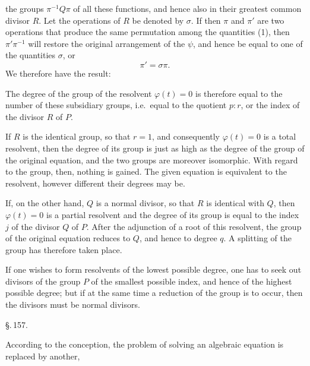 the groups $\pi^{-1}Q\pi$ of all these functions, and hence also in their
greatest common divisor $R$. Let the operations
of $R$ be denoted by $\sigma$. If then $\pi$ and $\pi'$ are two
operations that produce the same permutation among the quantities (1),
then $\pi'\pi^{-1}$ will restore the original arrangement of the $\psi$,
and hence be equal to one of the quantities $\sigma$, or
\[ \pi' = \sigma\pi. \]
We therefore have the result:

\begin{quote}
\end{quote}

The degree of the  group of the resolvent $\varphi(t) = 0$
is therefore equal to the number of these subsidiary groups, i.e.\ equal to the
quotient $p : r$, or the index of the divisor $R$ of $P$.

If $R$ is the identical group, so that $r = 1$, and consequently $\varphi(t) = 0$
is a total resolvent, then the degree of its group is just as high
as the degree of the group of the original equation, and the two
groups are moreover isomorphic. With regard to the group, then,
nothing is gained. The given equation is equivalent to the
resolvent, however different their degrees may be.

If, on the other hand, $Q$ is a normal divisor, so that $R$ is
identical with $Q$, then $\varphi(t) = 0$ is a partial resolvent and the degree
of its group is equal to the index $j$ of the divisor $Q$ of $P$.
After the adjunction of a root of this resolvent, the group
of the original equation reduces to $Q$, and hence to
degree $q$. A splitting of the group has therefore taken place.

If one wishes to form resolvents of the lowest possible
degree, one has to seek out divisors of the group $P$ of the smallest
possible index, and hence of the highest possible degree; but if
at the same time a reduction of the group is to occur, then the
divisors must be normal divisors.

\begin{center}
\S.\,157.

\end{center}

According to the  conception, the problem of solving
an algebraic equation is replaced by another,
